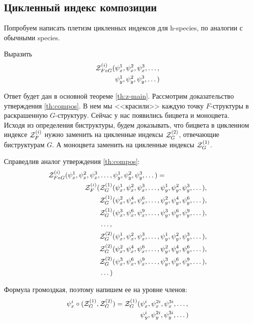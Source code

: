 \subsection{Цикленный индекс композиции}
Попробуем написать плетизм цикленных индексов для h-species,
по аналогии с обычными species.

\begin{problem}
Выразить
\begin{equation*}
\begin{split}
\mathcal Z^{(i)}_{F \circ G} (&\psi_x^1, \psi_x^2, \psi_x^3, \dots, \\
						&\psi_y^1, \psi_y^2, \psi_y^3, \dots)
\end{split}
\end{equation*}
\end{problem}
Ответ будет дан в основной теореме \ref{th:z-main}. Рассмотрим доказательство
утверждения \ref{th:compos}. В нем мы <<красили>> каждую точку $F$-структуры в
раскрашенную $G$-структуру. Сейчас у нас появились бицвета и моноцвета. Исходя
из определения биструктуры, будем доказывать, что бицвета в цикленном индексе
$\mathcal Z^{(i)}_F$ нужно заменить на цикленные индексы $\mathcal Z^{(2)}_G$, отвечающие биструктурам
$G$. А моноцвета заменить на цикленные индексы $\mathcal Z^{(1)}_G$.

\begin{theorem}
\label{th:z-main}
Справедлив аналог утверждения \ref{th:compos}:
\begin{equation}
\begin{split}
\label{eq:h-zfg}
	\mathcal Z^{(i)}_{F \circ G} (\psi_x^1, \psi_x^2, \psi_x^3, &\dots, 
	\psi_y^1, \psi_y^2, \psi_y^3, \dots) = \\
	\mathcal Z_F^{(i)}(
		&\mathcal Z^{(1)}_G(\psi_x^1, \psi_x^2, \psi_x^3, \dots, 
					 \psi_y^1, \psi_y^2, \psi_y^3, \dots), \\
		&\mathcal Z^{(1)}_G(\psi_x^2, \psi_x^4, \psi_x^6, \dots, 
					 \psi_y^2, \psi_y^4, \psi_y^6, \dots), \\
		&\mathcal Z^{(1)}_G(\psi_x^3, \psi_x^6, \psi_x^9, \dots, 
					 \psi_y^3, \psi_y^6, \psi_y^9, \dots), \\
		&\dots, \\
		&\mathcal Z^{(2)}_G(\psi_x^1, \psi_x^2, \psi_x^3, \dots, 
					 \psi_y^1, \psi_y^2, \psi_y^3, \dots), \\
		&\mathcal Z^{(2)}_G(\psi_x^2, \psi_x^4, \psi_x^6, \dots, 
					 \psi_y^2, \psi_y^4, \psi_y^6, \dots), \\
		&\mathcal Z^{(2)}_G(\psi_x^3, \psi_x^6, \psi_x^9, \dots, 
					 \psi_y^3, \psi_y^6, \psi_y^9, \dots), \\
		&\dots
	)
\end{split}	
\end{equation}
\end{theorem}
Формула громоздкая, поэтому напишем ее на уровне членов:
\begin{equation}
\label{eq:psi-x}
\begin{split}
\psi_x^i \circ (\mathcal Z^{(1)}_G, \mathcal Z^{(2)}_G ) = \mathcal Z^{(1)}_G
(&\psi_x^i, \psi_x^{2i}, \psi_x^{3i}, \dots, \\
&\psi_y^i, \psi_y^{2i}, \psi_y^{3i}, \dots)
\end{split}
\end{equation}

